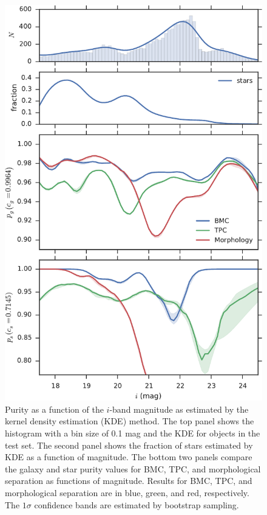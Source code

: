\begin{figure}[htp]
  \centering
  \includegraphics[width=0.7\linewidth]{figures/purity_mag.pdf}
  \caption{Purity as a function of the $i$-band magnitude
           as estimated by the kernel density estimation (KDE) method.
           The top panel shows the histogram with a bin size of 0.1 mag
           and the KDE for objects in the test set.
           The second panel shows the fraction of stars estimated by KDE
           as a function of magnitude.
           The bottom two panels compare
           the galaxy and star purity values for BMC, TPC, and 
           morphological separation as functions of magnitude.
           Results for BMC, TPC, and morphological separation are in
           blue, green, and red, respectively.
           The $1 \sigma$ confidence bands are estimated by
           bootstrap sampling.}
  \label{fig:purity_mag}
\end{figure}


